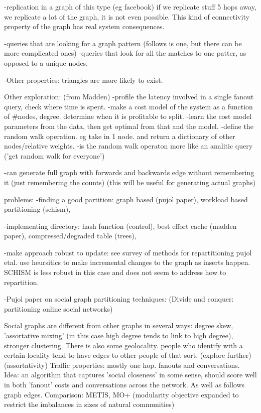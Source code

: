 \documentclass{article}
\begin{document}
-replication in a graph of this type (eg facebook) if we replicate stuff 5 hops away, we replicate a lot of the graph, it is not even possible.
This kind of connectivity property of the graph has real system consequences.   

-queries that are looking for a graph pattern (follows is one, but there can be more complicated ones)
-queries that look for all the matches to one patter, as opposed to  a unique nodes.

-Other properties: triangles are more likely to exist.

Other exploration: (from Madden)
-profile the latency involved in a single fanout query, check where time is spent.
-make a cost model of the system as a function of #nodes, degree. determine when it is profitable to split.
-learn the cost model parameters from the data, then get optimal from that and the model.
-define the random walk operation. eg take in 1 node. and return a dictionary of other nodes/relative weights.
-is the random walk operaton more like an analitic query ('get random walk for everyone')

-can generate full graph with forwards and backwards edge without remembering it (just remembering the counts)
 (this will be useful for generating actual graphs)

problems:
-finding a good partition:
graph based (pujol paper), workload based partitioning (schism), 

-implementing directory:
hash function (control), best effort cache (madden paper), compressed/degraded table (trees), 

-make approach robust to update:
see survey of methods for repartitioning
pujol etal. use heursitics to make incremental changes to the graph as inserts happen.
SCHISM is less robust in this case and does not seem to address how to repartition.

-Pujol paper on social graph partitioning techniques: (Divide and conquer: partitioning online social networks)

Social graphs are different from other graphs in several ways: degree skew, 'assortative mixing' (in this case high degree tends to link to high degree), 
stronger clustering.
There is also some geolocality. people who identify with a certain locality tend to have edges to other people of that sort. (explore further) (assortativity)
Traffic properties: mostly one hop. fanouts and conversations. 
Idea: an algorithm that captures 'social closeness' in some sense, should score well in both 'fanout' costs and
conversations across the network. As well as follows graph edges.
Comparison: METIS, MO+ (modularity objective expanded to restrict the imbalances in sizes of natural communities)
\end{document}
